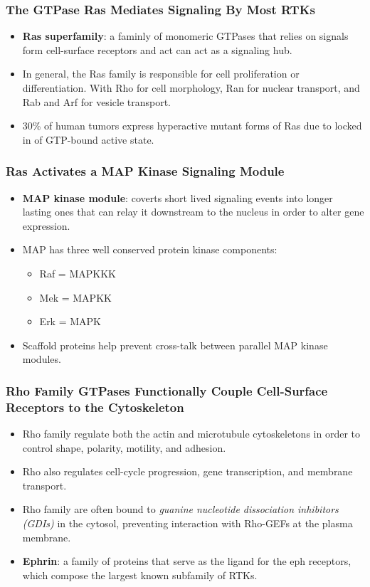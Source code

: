 \documentclass[12pt,a4paper]{article}
\begin{document}
\subsubsection{The GTPase Ras Mediates Signaling By Most RTKs}
\begin{itemize}
    \item \textbf{Ras superfamily}: a faminly of monomeric GTPases that relies on signals form cell-surface receptors and act can act as a signaling hub.
    \item In general, the Ras family is responsible for cell proliferation or differentiation. With Rho for cell morphology, Ran for nuclear transport, and Rab and Arf for vesicle transport.
    \item 30\% of human tumors express hyperactive mutant forms of Ras due to locked in of GTP-bound active state.
\end{itemize}

\subsubsection{Ras Activates a MAP Kinase Signaling Module}
\begin{itemize}
    \item \textbf{MAP kinase module}: coverts short lived signaling events into longer lasting ones that can relay it downstream to the nucleus in order to alter gene expression.
    \item MAP has three well conserved protein kinase components:
        \begin{itemize}
            \item Raf = MAPKKK
            \item Mek = MAPKK
            \item Erk = MAPK 
        \end{itemize}
    \item Scaffold proteins help prevent cross-talk between parallel MAP kinase modules.
\end{itemize}

\subsubsection{Rho Family GTPases Functionally Couple Cell-Surface Receptors to the Cytoskeleton}
\begin{itemize}
    \item Rho family regulate both the actin and microtubule cytoskeletons in order to control shape, polarity, motility, and adhesion.
    \item Rho also regulates cell-cycle progression, gene transcription, and membrane transport.
    \item Rho family are often bound to \textit{guanine nucleotide dissociation inhibitors (GDIs)} in the cytosol, preventing interaction with Rho-GEFs at the plasma membrane.
    \item \textbf{Ephrin}: a family of proteins that serve as the ligand for the eph receptors, which compose the largest known subfamily of RTKs.
\end{itemize}
\end{document}
